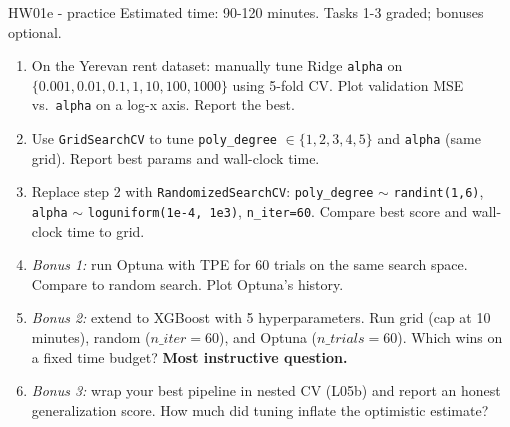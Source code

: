 \documentclass[aspectratio=169]{beamer}
\begin{document}
\begin{frame}{HW01e - practice}
  \footnotesize Estimated time: 90-120 minutes. Tasks 1-3 graded; bonuses optional.
  \begin{enumerate}\small
    \item On the Yerevan rent dataset: manually tune Ridge \texttt{alpha} on $\{0.001, 0.01, 0.1, 1, 10, 100, 1000\}$ using 5-fold CV. Plot validation MSE vs.\ \texttt{alpha} on a log-x axis. Report the best.
    \item Use \texttt{GridSearchCV} to tune \texttt{poly\_degree} $\in \{1,2,3,4,5\}$ and \texttt{alpha} (same grid). Report best params and wall-clock time.
    \item Replace step 2 with \texttt{RandomizedSearchCV}: \texttt{poly\_degree} $\sim$ \texttt{randint(1,6)}, \texttt{alpha} $\sim$ \texttt{loguniform(1e-4, 1e3)}, \texttt{n\_iter=60}. Compare best score and wall-clock time to grid.
    \item \emph{Bonus 1:} run Optuna with TPE for 60 trials on the same search space. Compare to random search. Plot Optuna's history.
    \item \emph{Bonus 2:} extend to XGBoost with 5 hyperparameters. Run grid (cap at 10 minutes), random ($n\_iter=60$), and Optuna ($n\_trials=60$). Which wins on a fixed time budget? \textbf{Most instructive question.}
    \item \emph{Bonus 3:} wrap your best pipeline in nested CV (L05b) and report an honest generalization score. How much did tuning inflate the optimistic estimate?
  \end{enumerate}
\end{frame}
\end{document}
